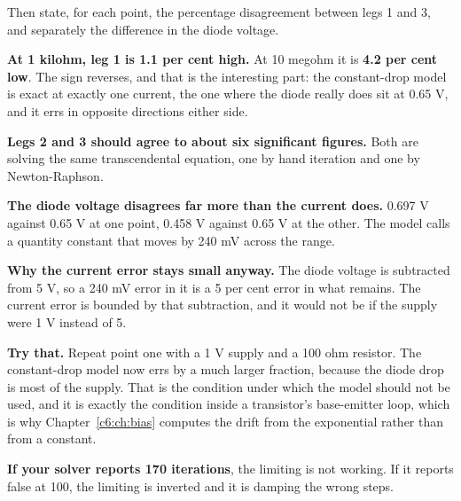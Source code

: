 Then state, for each point, the percentage disagreement between legs 1 and 3, and separately the difference in the diode voltage.

\textbf{At 1 kilohm, leg 1 is 1.1 per cent high.} At 10 megohm it is \textbf{4.2 per cent low}. The sign reverses, and that is the interesting part: the constant-drop model is exact at exactly one current, the one where the diode really does sit at 0.65 V, and it errs in opposite directions either side.

\textbf{Legs 2 and 3 should agree to about six significant figures.} Both are solving the same transcendental equation, one by hand iteration and one by Newton-Raphson.

\textbf{The diode voltage disagrees far more than the current does.} 0.697 V against 0.65 V at one point, 0.458 V against 0.65 V at the other. The model calls a quantity constant that moves by 240 mV across the range.

\textbf{Why the current error stays small anyway.} The diode voltage is subtracted from 5 V, so a 240 mV error in it is a 5 per cent error in what remains. The current error is bounded by that subtraction, and it would not be if the supply were 1 V instead of 5.

\textbf{Try that.} Repeat point one with a 1 V supply and a 100 ohm resistor. The constant-drop model now errs by a much larger fraction, because the diode drop is most of the supply. That is the condition under which the model should not be used, and it is exactly the condition inside a transistor's base-emitter loop, which is why Chapter~\ref{c6:ch:bias} computes the drift from the exponential rather than from a constant.

\textbf{If your solver reports 170 iterations}, the limiting is not working. If it reports  false at 100, the limiting is inverted and it is damping the wrong steps.
